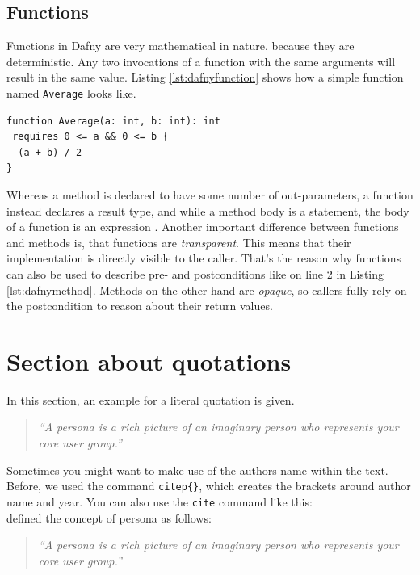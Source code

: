 \documentclass[a4paper]{article}
\begin{document}
\subsection{Functions}
Functions in Dafny are very mathematical in nature, because they are deterministic. Any two invocations of a
function with the same arguments will result in the same value. Listing \ref{lst:dafnyfunction} shows how a simple
function named \texttt{Average} looks like.
\begin{lstlisting}[style=dafnystyle, caption={A simple function in Dafny.}, label={lst:dafnyfunction}]
function Average(a: int, b: int): int 
 requires 0 <= a && 0 <= b {
  (a + b) / 2
}
\end{lstlisting}
Whereas a method is declared to have some number of out-parameters, a function instead declares a result type,
and while a method body is a statement, the body of a function is an expression \cite{leino2023program}.
Another important difference between functions and methods is, that functions are \textit{transparent}. This means
that their implementation is directly visible to the caller. That's the reason why functions can also be used
to describe pre- and postconditions like on line 2 in Listing \ref{lst:dafnymethod}. Methods on the other hand are
\textit{opaque}, so callers fully rely on the postcondition to reason about their return values.

\section{Section about quotations} %
\label{sec:section_about_quotations}

In this section, an example for a literal quotation is given.

\begin{quotation}
	\emph{``A persona is a rich picture of an imaginary person who represents your core user group.''}
	\citep{Dix04}
\end{quotation}

Sometimes you might want to make use of the authors name within the text. Before, we used the command \texttt{citep\{\}}, which creates the brackets around author name and year. You can also use the \texttt{cite} command like this: \\

\cite{Dix04} defined the concept of persona as follows:
\begin{quotation}
	\emph{``A persona is a rich picture of an imaginary person who represents your core user group.''}
	\citep{Dix04}
\end{quotation}
\end{document}
